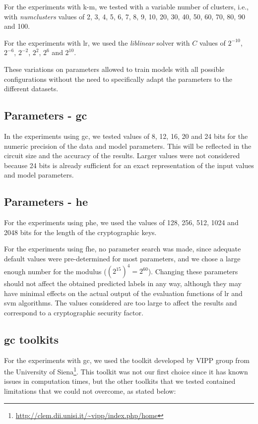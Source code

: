 For the experiments with \ac{k-m}, we tested with a variable number of clusters, i.e., with \textit{num\textunderscore clusters} values of 2, 3, 4, 5, 6, 7, 8, 9, 10, 20, 30, 40, 50, 60, 70, 80, 90 and 100.

For the experiments with \ac{lr}, we used the \textit{liblinear} solver with $C$ values of $2^{-10}$, $2^{-6}$, $2^{-2}$, $2^{2}$, $2^{6}$ and $2^{10}$.

 These variations on parameters allowed to train models with all possible configurations without the need to specifically adapt the parameters to the different datasets.



\subsection{Parameters - \acl{gc}}

In the experiments using \ac{gc}, we tested values of 8, 12, 16, 20 and 24 bits for the numeric precision of the data and model parameters. This will be reflected in the circuit size and the accuracy of the results. Larger values were not considered because 24 bits is already sufficient for an exact representation of the input values and model parameters.

\subsection{Parameters - \acl{he}}

For the experiments using \ac{phe}, we used the values of 128, 256, 512, 1024 and 2048 bits for the length of the cryptographic keys.

For the experiments using \ac{fhe}, no parameter search was made, since adequate default values were pre-determined for most parameters, and we chose a large enough number for the modulus ($(2^{15})^4=2^{60}$). Changing these parameters should not affect the obtained predicted labels in any way, although they may have minimal effects on the actual output of the evaluation functions of \ac{lr} and \ac{svm} algorithms. The values considered are too large to affect the results and correspond to a cryptographic security factor.



\subsection{\acl{gc} toolkits}


For the experiments with \ac{gc}, we used the toolkit developed by VIPP group from the University of Siena\footnote{\url{http://clem.dii.unisi.it/~vipp/index.php/home}}. This toolkit was not our first choice since it has known issues in computation times, but the other toolkits that we tested contained limitations that we could not overcome, as stated below:

